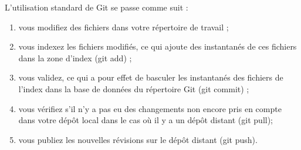 L'utilisation standard de Git se passe comme suit :
\begin{enumerate}
	\item vous modifiez des fichiers dans votre répertoire de travail ;
	\item vous indexez les fichiers modifiés, ce qui ajoute des instantanés de ces fichiers dans la zone d'index (git add) ;
	\item vous validez, ce qui a pour effet de basculer les instantanés des fichiers de l'index dans la base de données du répertoire Git (git commit) ;
	\item vous vérifiez s'il n'y a pas eu des changements non encore pris en compte dans votre dépôt local dans le cas où il y a un dépôt distant (git pull);
	\item vous publiez les nouvelles révisions sur le dépôt distant (git push).
\end{enumerate}
